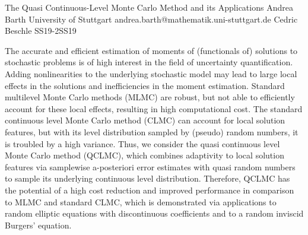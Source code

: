 \begin{talk}
  {The Quasi Continuous-Level Monte Carlo Method and its Applications}%
  {Andrea Barth}%
  {University of Stuttgart}%
  {andrea.barth@mathematik.uni-stuttgart.de}%
  {Cedric Beschle}%
{}{}{SS19-2}{SS19}


				
				

The accurate and efficient estimation of moments of (functionals of) solutions to stochastic problems is of high interest in the field of uncertainty quantification. Adding nonlinearities to the underlying
stochastic model may lead to large local effects in the solutions and inefficiencies in the moment estimation. Standard multilevel Monte Carlo methods (MLMC) are robust, but not able to efficiently account for these local effects, resulting in high computational cost. The standard continuous level Monte Carlo method (CLMC) can account for local solution features, but with its level distribution sampled by (pseudo) random numbers, it is troubled by a high variance. Thus, we consider the quasi continuous level Monte Carlo method (QCLMC), which combines adaptivity to local solution features via samplewise a-posteriori error estimates with quasi random numbers to sample its underlying continuous level distribution. Therefore, QCLMC has the potential of a high cost reduction and improved performance in comparison to MLMC and standard CLMC, which is demonstrated via applications to random elliptic equations with discontinuous coefficients and to a random inviscid Burgers’ equation.

% 

\end{talk}

